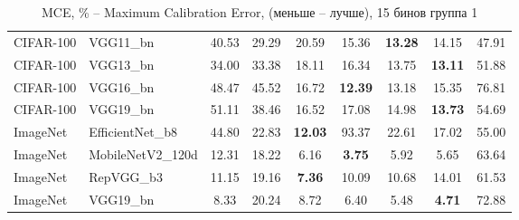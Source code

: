 \begin{table}[h!]
{\begin{tabular}{llccccccc}
CIFAR-100 &          VGG11\_bn &         40.53 &        29.29 &                  20.59 &                  15.36 & \textbf{13.28} &                  14.15 &       47.91 \\
CIFAR-100 &          VGG13\_bn &         34.00 &        33.38 &                  18.11 &                  16.34 &                  13.75 & \textbf{13.11} &       51.88 \\
CIFAR-100 &          VGG16\_bn &         48.47 &        45.52 &                  16.72 & \textbf{12.39} &                  13.18 &                  15.35 &       76.81 \\
CIFAR-100 &          VGG19\_bn &         51.11 &        38.46 &                  16.52 &                  17.08 &                  14.98 & \textbf{13.73} &       54.69 \\
 ImageNet &   EfficientNet\_b8 &         44.80 &        22.83 & \textbf{12.03} &                  93.37 &                  22.61 &                  17.02 &       55.00 \\
 ImageNet &  MobileNetV2\_120d &         12.31 &        18.22 &                   6.16 &  \textbf{3.75} &                   5.92 &                   5.65 &       63.64 \\
 ImageNet &         RepVGG\_b3 &         11.15 &        19.16 &  \textbf{7.36} &                  10.09 &                  10.68 &                  14.01 &       61.53 \\
 ImageNet &          VGG19\_bn &          8.33 &        20.24 &                   8.72 &                   6.40 &                   5.48 &  \textbf{4.71} &       72.88 \\
\bottomrule
\end{tabular}%
}
\caption{MCE, \% -- Maximum Calibration Error, (меньше -- лучше), 15 бинов группа 1}
\label{tab:metrics:MCE_1}
\end{table}
